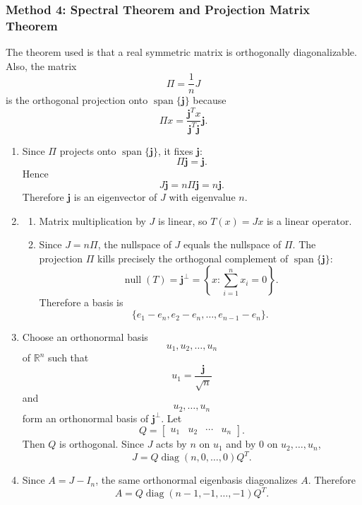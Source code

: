 \documentclass[12pt]{article}
\newcommand{\R}{\mathbb{R}}
\newcommand{\Null}{\operatorname{null}}
\newcommand{\Span}{\operatorname{span}}
\newcommand{\diag}{\operatorname{diag}}
\begin{document}
\newpage
\subsubsection{Method 4: Spectral Theorem and Projection Matrix Theorem}
The theorem used is that a real symmetric matrix is orthogonally diagonalizable. Also, the matrix
\[
\Pi=\frac1nJ
\]
is the orthogonal projection onto $\Span\{\mathbf j\}$ because
\[
\Pi x=\frac{\mathbf j^Tx}{\mathbf j^T\mathbf j}\mathbf j.
\]

\begin{enumerate}[label=(\alph*)]
  \item Since $\Pi$ projects onto $\Span\{\mathbf j\}$, it fixes $\mathbf j$:
  \[
  \Pi\mathbf j=\mathbf j.
  \]
  Hence
  \[
  J\mathbf j=n\Pi\mathbf j=n\mathbf j.
  \]
  Therefore $\mathbf j$ is an eigenvector of $J$ with eigenvalue $n$.

  \item
  \begin{enumerate}[label=(\roman*)]
    \item Matrix multiplication by $J$ is linear, so $T(x)=Jx$ is a linear operator.

    \item Since $J=n\Pi$, the nullspace of $J$ equals the nullspace of $\Pi$. The projection $\Pi$ kills precisely the orthogonal complement of $\Span\{\mathbf j\}$:
    \[
    \Null(T)=\mathbf j^\perp=\left\{x:\sum_{i=1}^{n}x_i=0\right\}.
    \]
    Therefore a basis is
    \[
    \boxed{\{e_1-e_n,e_2-e_n,\ldots,e_{n-1}-e_n\}.}
    \]
  \end{enumerate}

  \item Choose an orthonormal basis
  \[
  u_1,u_2,\ldots,u_n
  \]
  of $\R^n$ such that
  \[
  u_1=\frac{\mathbf j}{\sqrt n}
  \]
  and
  \[
  u_2,
  \ldots,u_n
  \]
  form an orthonormal basis of $\mathbf j^\perp$. Let
  \[
  Q=\begin{bmatrix}u_1&u_2&\cdots&u_n\end{bmatrix}.
  \]
  Then $Q$ is orthogonal. Since $J$ acts by $n$ on $u_1$ and by $0$ on $u_2,
  \ldots,u_n$,
  \[
  \boxed{J=Q\diag(n,0,\ldots,0)Q^T.}
  \]

  \item Since $A=J-I_n$, the same orthonormal eigenbasis diagonalizes $A$. Therefore
  \[
  \boxed{A=Q\diag(n-1,-1,\ldots,-1)Q^T.}
  \]
\end{enumerate}

\newpage
\end{document}
